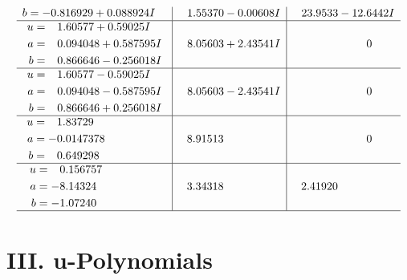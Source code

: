 \documentclass[1p]{elsarticle_modified}
\theoremstyle{definition}
\begin{document}
$$\begin{array}{c|c|c}
\begin{aligned}
b &= -0.816929 + 0.088924 I\end{aligned}
 & \phantom{-}1.55370 - 0.00608 I & \phantom{-}23.9533 - 12.6442 I \\ \hline\begin{aligned}
u &= \phantom{-}1.60577 + 0.59025 I \\
a &= \phantom{-}0.094048 + 0.587595 I \\
b &= \phantom{-}0.866646 - 0.256018 I\end{aligned}
 & \phantom{-}8.05603 + 2.43541 I & \phantom{-0.000000 } 0 \\ \hline\begin{aligned}
u &= \phantom{-}1.60577 - 0.59025 I \\
a &= \phantom{-}0.094048 - 0.587595 I \\
b &= \phantom{-}0.866646 + 0.256018 I\end{aligned}
 & \phantom{-}8.05603 - 2.43541 I & \phantom{-0.000000 } 0 \\ \hline\begin{aligned}
u &= \phantom{-}1.83729\phantom{ +0.000000I} \\
a &= -0.0147378\phantom{ +0.000000I} \\
b &= \phantom{-}0.649298\phantom{ +0.000000I}\end{aligned}
 & \phantom{-}8.91513\phantom{ +0.000000I} & \phantom{-0.000000 } 0 \\ \hline\begin{aligned}
u &= \phantom{-}0.156757\phantom{ +0.000000I} \\
a &= -8.14324\phantom{ +0.000000I} \\
b &= -1.07240\phantom{ +0.000000I}\end{aligned}
 & \phantom{-}3.34318\phantom{ +0.000000I} & \phantom{-}2.41920\phantom{ +0.000000I}\\
 \hline 
 \end{array}$$\newpage
\newpage\renewcommand{\arraystretch}{1}
\centering \section*{ III. u-Polynomials}
\end{document}
